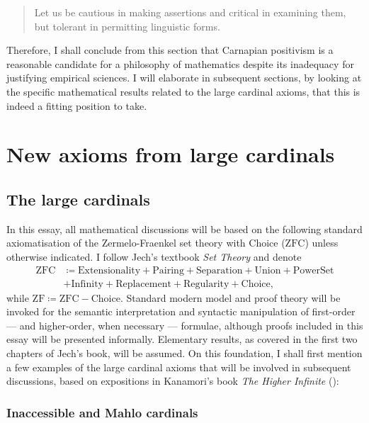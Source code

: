 \documentclass[12pt]{article}
\theoremstyle{plain}
\theoremstyle{definition}
\newcommand{\ZFC}{\mathrm{ZFC}}
\newcommand{\ZF}{\mathrm{ZF}}
\begin{document}
\begin{quote}
	Let us be cautious in making assertions and critical in examining them, but tolerant in permitting linguistic forms.
\end{quote}

Therefore, I shall conclude from this section that Carnapian positivism is a reasonable candidate for a philosophy of mathematics despite its inadequacy for justifying empirical sciences. I will elaborate in subsequent sections, by looking at the specific mathematical results related to the large cardinal axioms, that this is indeed a fitting position to take.

\section{New axioms from large cardinals}

\subsection{The large cardinals}

In this essay, all mathematical discussions will be based on the following standard axiomatisation of the Zermelo-Fraenkel set theory with Choice ($\ZFC$) unless otherwise indicated. I follow Jech's textbook \emph{Set Theory} \cite{jech-set-theory} and denote
\begin{align*}
	\ZFC & \coloneqq \text{Extensionality} + \text{Pairing} + \text{Separation} + \text{Union} + \text{PowerSet} \\
	     & + \text{Infinity} + \text{Replacement} + \text{Regularity} + \text{Choice},
\end{align*}
while $\ZF \coloneqq \ZFC - \text{Choice}$. Standard modern model and proof theory will be invoked for the semantic interpretation and syntactic manipulation of first-order --- and higher-order, when necessary --- formulae, although proofs included in this essay will be presented informally. Elementary results, as covered in the first two chapters of Jech's book, will be assumed. On this foundation, I shall first mention a few examples of the large cardinal axioms that will be involved in subsequent discussions, based on expositions in Kanamori's book \emph{The Higher Infinite} (\cite
{higher-infinite}):

\subsubsection*{Inaccessible and Mahlo cardinals}
\end{document}
